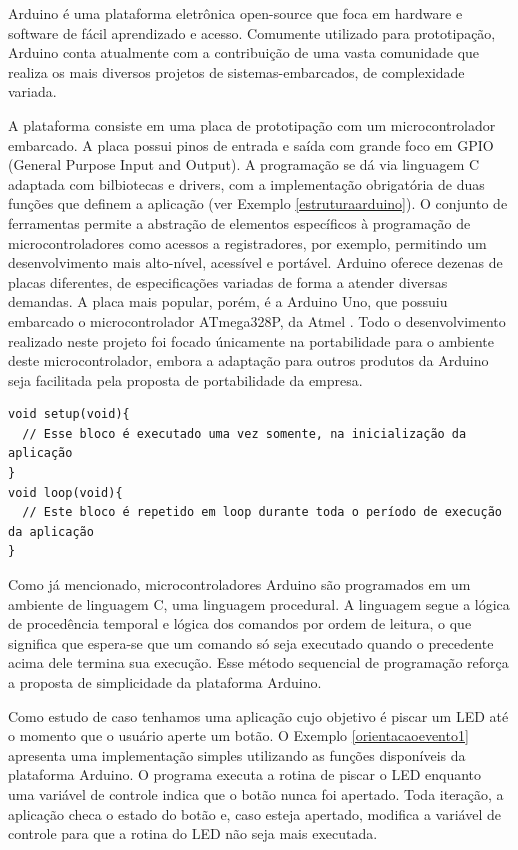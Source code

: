 \documentclass[11pt]{article}
\begin{document}
\tab Arduino é uma plataforma eletrônica open-source que foca em hardware e software de fácil aprendizado e acesso. Comumente utilizado para prototipação, Arduino conta atualmente com a contribuição de uma vasta comunidade que realiza os mais diversos projetos de sistemas-embarcados, de complexidade variada. \cite{arduinoblog}
\par A plataforma consiste em uma placa de prototipação com um microcontrolador embarcado. A placa possui pinos de entrada e saída com grande foco em GPIO (General Purpose Input and Output). A programação se dá via linguagem C adaptada com bilbiotecas e drivers, com a implementação obrigatória de duas funções que definem a aplicação (ver Exemplo \ref{estruturaarduino}). O conjunto de ferramentas permite a abstração de elementos específicos à programação de microcontroladores como acessos a registradores, por exemplo, permitindo um desenvolvimento mais alto-nível, acessível e portável. Arduino oferece dezenas de placas diferentes, de especificações variadas de forma a atender diversas demandas. A placa mais popular, porém, é a Arduino Uno, que possuiu embarcado o microcontrolador ATmega328P, da Atmel \cite{atmegadatasheet}. Todo o desenvolvimento realizado neste projeto foi focado únicamente na portabilidade para o ambiente deste microcontrolador, embora a adaptação para outros produtos da Arduino seja facilitada pela proposta de portabilidade da empresa.
\begin{lstlisting}[style=CStyle,label=estruturaarduino,caption=Estrutura de uma aplicação Arduino]
void setup(void){
  // Esse bloco é executado uma vez somente, na inicialização da aplicação
}
void loop(void){
  // Este bloco é repetido em loop durante toda o período de execução da aplicação
}
\end{lstlisting}
\par Como já mencionado, microcontroladores Arduino são programados em um ambiente de linguagem C, uma linguagem procedural. A linguagem segue a lógica de procedência temporal e lógica dos comandos por ordem de leitura, o que significa que espera-se que um comando só seja executado quando o precedente acima dele termina sua execução. Esse método sequencial de programação reforça a proposta de simplicidade da plataforma Arduino. 
\par Como estudo de caso tenhamos uma aplicação cujo objetivo é piscar um LED até o momento que o usuário aperte um botão. O Exemplo \ref{orientacaoevento1} apresenta uma implementação simples utilizando as funções disponíveis da plataforma Arduino. O programa executa a rotina de piscar o LED enquanto uma variável de controle indica que o botão nunca foi apertado. Toda iteração, a aplicação checa o estado do botão e, caso esteja apertado, modifica a variável de controle para que a rotina do LED não seja mais executada.
\end{document}
